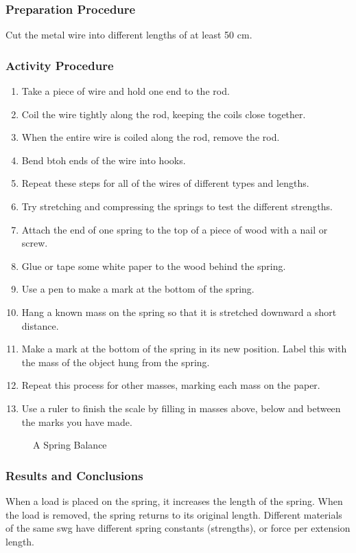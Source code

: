 \subsubsection*{Preparation Procedure}
Cut the metal wire into different lengths of at least 50 cm.

\subsubsection*{Activity Procedure}
\begin{enumerate}
\item{Take a piece of wire and hold one end to the rod.}
\item{Coil the wire tightly along the rod, keeping the coils close together.}
\item{When the entire wire is coiled along the rod, remove the rod.}
\item{Bend btoh ends of the wire into hooks.}
\item{Repeat these steps for all of the wires of different types and lengths.}
\item{Try stretching and compressing the springs to test the different strengths.}
\item{Attach the end of one spring to the top of a piece of wood with a nail or screw.}
\item{Glue or tape some white paper to the wood behind the spring.}
\item{Use a pen to make a mark at the bottom of the spring.}
\item{Hang a known mass on the spring so that it is stretched downward a short distance.}
\item{Make a mark at the bottom of the spring in its new position.  Label this with the mass of the object hung from the spring.}
\item{Repeat this process for other masses, marking each mass on the paper.}
\item{Use a ruler to finish the scale by filling in masses above, below and between the marks you have made.}
\end{enumerate}

\begin{figure}
\begin{center}
\def\svgwidth{150pt}

\caption{A Spring Balance}
\label{fig:spring-balance}
\end{center}
\end{figure}

\subsubsection*{Results and Conclusions}
When a load is placed on the spring, it increases the length of the spring.  When the load is removed, the spring returns to its original length.
Different materials of the same swg have different spring constants (strengths), or force per extension length.

